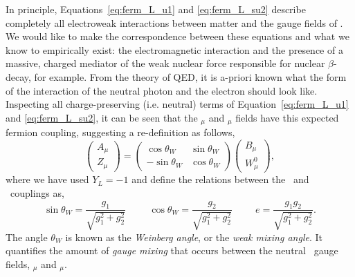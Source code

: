 In principle, Equations~\ref{eq:ferm_L_u1} and \ref{eq:ferm_L_su2} describe completely
all electroweak interactions
between matter and the gauge fields of \SUewk. We would like to make the correspondence
between these equations and what we know to empirically exist: the electromagnetic interaction
and the presence of a massive, charged mediator of the weak nuclear force responsible
for nuclear $\beta$-decay, for example. From the theory of QED, it is a-priori known what the
form of the interaction of the neutral photon and the electron should look like.
Inspecting all charge-preserving (i.e. neutral) terms of Equation~\ref{eq:ferm_L_u1} and \ref{eq:ferm_L_su2},
it can be seen that the \fieldB$_{\mu}$ and \fieldWzero$_{\mu}$ fields have this expected
fermion coupling, suggesting a re-definition as follows,
\begin{equation}
	\left( \begin{matrix} A_{\mu} \\ Z_{\mu} \end{matrix} \right) = \left( \begin{matrix} \cos \theta_W & \sin \theta_W \\ -\sin \theta_W & \cos \theta_W \end{matrix} \right) \left( \begin{matrix} B_{\mu} \\ W_{\mu}^0 \end{matrix} \right),
	\label{eq:su2rotation}
\end{equation}
where we have used $Y_L = -1$ and define the relations between the \SUtwo~and \Uone~couplings as,
\begin{equation}
\sin \theta_W = \frac{g_1}{\sqrt{g_1^2 + g_2^2}} \hspace{1cm} \cos \theta_W = \frac{g_2}{\sqrt{g_1^2 + g_2^2}} \hspace{1cm} e = \frac{g_1 g_2}{\sqrt{g_1^2 + g_2^2}}.
\label{eq:weinberg_angles}
\end{equation}
The angle $\theta_W$  is known as the \textit{Weinberg angle}, or the \textit{weak mixing angle}.
It quantifies the amount of \textit{gauge mixing} that occurs between the neutral
\SUewk~gauge fields, \fieldB$_{\mu}$ and \fieldWzero$_{\mu}$.

